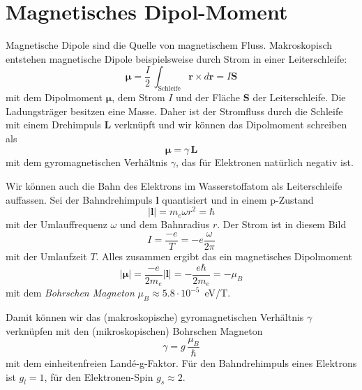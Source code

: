 \section{Magnetisches Dipol-Moment}

Magnetische Dipole sind die Quelle von magnetischem Fluss. Makroskopisch entstehen magnetische Dipole beispielsweise durch Strom in einer Leiterschleife:
\begin{equation}
    \bm{\mu} = \frac{I}{2} \,  \int_\text{Schleife} \bm{r} \times d\bm{r} = I \bm{S}
\end{equation}
mit dem Dipolmoment $\bm{\mu}$, dem Strom $I$ und der Fläche $\bm{S}$ der Leiterschleife. Die Ladungsträger besitzen eine Masse. Daher ist der Stromfluss durch die Schleife mit einem Drehimpuls $\bm{L}$ verknüpft und wir können das Dipolmoment schreiben als 
\begin{equation}
    \bm{\mu} = \gamma \, \bm{L}
\end{equation}
mit dem gyromagnetischen Verhältnis $\gamma$, das für Elektronen natürlich negativ ist.

Wir können auch die Bahn des Elektrons im Wasserstoffatom als Leiterschleife auffassen. Sei der Bahndrehimpuls $\bm{l}$ quantisiert und in einem p-Zustand
\begin{equation}
    | \bm{l} | = m_e \omega r^2  = \hbar
\end{equation}
mit der Umlauffrequenz $\omega$ und dem Bahnradius $r$. Der Strom ist in diesem Bild
\begin{equation}
    I = \frac{-e}{T} = -e \frac{\omega}{2\pi}
\end{equation}
mit der Umlaufzeit $T$. Alles zusammen ergibt das ein magnetisches Dipolmoment
\begin{equation}
   | \bm{\mu} | = \frac{-e}{2 m_e}  |\bm{l} | = - \frac{e \hbar}{2 m_e} = - \mu_B
\end{equation}
mit dem \emph{Bohrschen Magneton} $\mu_B \approx 5.8 \cdot 10^{-5}$~eV/T.

Damit können wir das (makroskopische) gyromagnetischen Verhältnis $\gamma$ verknüpfen mit den (mikroskopischen) Bohrschen Magneton
\begin{equation}
    \gamma = g \, \frac{\mu_B}{\hbar}
\end{equation}
mit dem einheitenfreien Landé-g-Faktor. Für den Bahndrehimpuls eines Elektrons ist $g_l = 1$, für den Elektronen-Spin $g_s \approx 2$.

